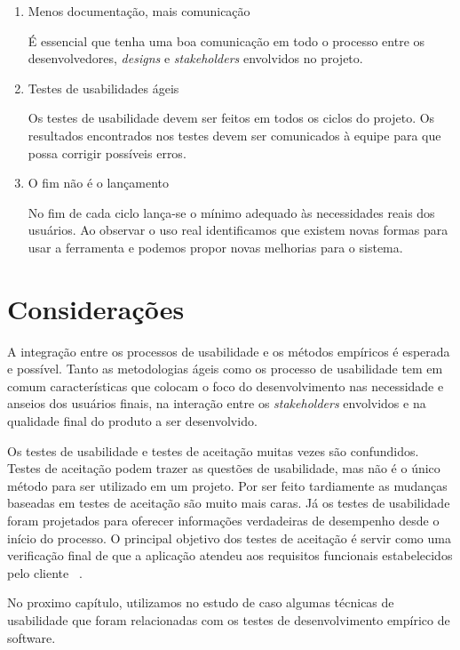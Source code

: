 \begin{enumerate}
	
\item Menos documentação, mais comunicação

	É essencial que tenha uma boa comunicação em todo o processo entre os desenvolvedores, \emph{designs} e \textit{stakeholders} envolvidos no projeto.



\item Testes de usabilidades ágeis

	Os testes de usabilidade devem ser feitos em todos os ciclos do projeto.  Os resultados encontrados nos testes devem ser comunicados à equipe para que possa corrigir possíveis erros.

\item O fim não é o lançamento

	No fim de cada ciclo lança-se o mínimo adequado às necessidades reais dos usuários. Ao observar o uso real identificamos que existem novas formas para usar a ferramenta e podemos propor novas melhorias para o sistema. 
	
\end{enumerate}


\section{Considerações}

	A integração entre os processos de usabilidade e os métodos empíricos é esperada e possível. Tanto as metodologias ágeis como os processo de usabilidade tem em comum características que colocam o foco do desenvolvimento nas necessidade e anseios dos usuários finais, na interação entre os \textit{stakeholders} envolvidos e na qualidade final do produto a ser desenvolvido. 
	
	Os testes de usabilidade e testes de aceitação muitas vezes são confundidos. Testes de aceitação podem trazer as questões de usabilidade, mas não é o único método para ser utilizado em um projeto. Por ser feito tardiamente as mudanças baseadas em testes de aceitação são muito mais caras. Já os testes de usabilidade foram projetados para oferecer informações verdadeiras de desempenho desde o início do processo.  
%
O principal objetivo dos testes de aceitação é servir como uma verificação final de que a aplicação atendeu aos requisitos funcionais estabelecidos pelo cliente ~\cite{preece2007}.

No proximo capítulo, utilizamos no estudo de caso algumas técnicas de usabilidade que foram relacionadas com os testes de desenvolvimento empírico de software.





